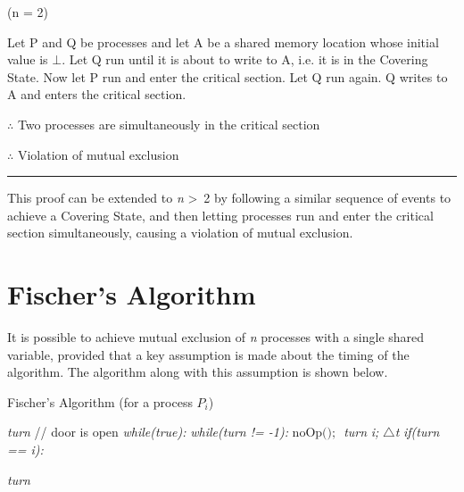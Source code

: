 \documentclass[twoside]{article}
\makeatletter
\newenvironment{proof}{{\bf Proof:}}{\hfill\rule{2mm}{2mm}}
\def\BState{\State\hskip-\ALG@thistlm}
\makeatother
\begin{document}
\begin{proof}
(n = 2)

Let P and Q be processes and let A be a shared memory location whose initial value is $\bot$. Let Q run until it is about to write to A, i.e. it is in the Covering State. Now let P run and enter the critical section. Let Q run again. Q writes to A and enters the critical section. 

$\therefore$ Two processes are simultaneously in the critical section

$\therefore$ Violation of mutual exclusion
\end{proof}

This proof can be extended to \textit{n} \textgreater \ 2 by following a similar sequence of events to achieve a Covering State, and then letting processes run and enter the critical section simultaneously, causing a violation of mutual exclusion.

\section{Fischer's Algorithm}

It is possible to achieve mutual exclusion of \textit{n} processes with a single shared variable, provided that a key assumption is made about the timing of the algorithm. The algorithm along with this assumption is shown below.

\begin{algorithm}
\caption{Fischer's Algorithm (for a process ${P_i}$)}\label{fischers}
\begin{algorithmic}[1]
\State {} \textit{turn}   // door is open \newline
{}
\State \emph{while(true):}
\Indent
	\State \emph{while(turn != -1):}
    \Indent
		\State $ \text{noOp(); }$
    \EndIndent
    \State \textit{turn} \text{=} \textit{i;}
    \State {} \textit{$\bigtriangleup$t} 
    \State \emph{if(turn == i):}
    \Indent 
    	\State {}
    \EndIndent 
\EndIndent 
\EndProcedure \newline

\State \textit{turn} 
\EndProcedure
\end{algorithmic}
\end{algorithm}
\end{document}
